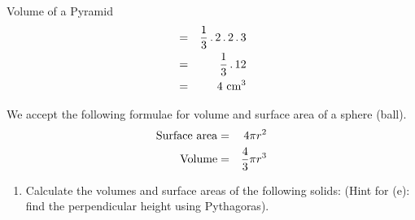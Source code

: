 \begin{wex}{Volume of a Pyramid}
{
\begin{eqnarray*}
&=&\frac{1}{3}\,.\, 2 \,.\, 2 \,.\, 3\\
&=&\frac{1}{3} \,.\, 12\\
&=&4\textnormal{ cm}^3
\end{eqnarray*}
}
\end{wex}


We accept the following formulae for volume and surface area of a sphere (ball).
\begin{eqnarray*}
\textnormal{Surface area} &=& 4 \pi r^2\\
\textnormal{Volume} &=& \frac{4}{3} \pi r^3\\
\end{eqnarray*}

{
\begin{enumerate}

\item Calculate the volumes and surface areas of the following solids: (Hint for (e): find the perpendicular height using Pythagoras). 


\end{enumerate}}
